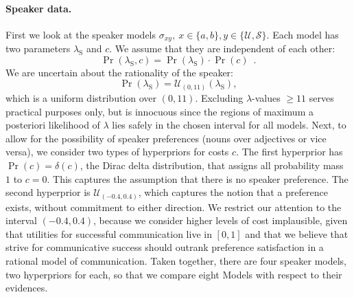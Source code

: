 \paragraph{Speaker data.} First we look at the speaker models $\sigma_{xy},\
x\in\{a,b\},y\in\{\mathcal{U},\mathcal{S}\}$. Each model has two
parameters $\lambda_\mathrm{S}$ and $c$. We assume that they are
independent of each other:
\begin{equation}\label{hyper-speaker-independent}
\Pr(\lambda_\mathrm{S},c)=\Pr(\lambda_\mathrm{S}) \cdot \Pr(c) \enspace .
\end{equation}
We are uncertain about the rationality of the speaker:
\begin{equation}\label{hyper-speaker-lambda}
\Pr(\lambda_\mathrm{S})= \mathcal{U}_{(0,11)}(\lambda_\mathrm{S}),
\end{equation}
which is a uniform distribution over $(0,11)$. Excluding
$\lambda$-values $\ge 11$ serves practical purposes only, but is
innocuous since the regions of maximum a posteriori likelihood of
$\lambda$ lies safely in the chosen interval for all models. Next, to
allow for the possibility of speaker preferences (nouns over
adjectives or vice versa), we consider two types of hyperpriors for
costs $c$. The first hyperprior has $\Pr(c)= \delta(c)$, the Dirac
delta distribution, that assigns all probability mass $1$ to
$c=0$. This captures the assumption that there is no speaker
preference. The second hyperprior is $\mathcal{U}_{(-0.4,0.4)}$, which
captures the notion that a preference exists, without commitment to
either direction. We restrict our attention to the interval
$(-0.4,0.4)$, because we consider higher levels of cost implausible,
given that utilities for successful communication live in $[0,1]$ and
that we believe that strive for communicative success should outrank
preference satisfaction in a rational model of communication. Taken
together, there are four speaker models, two hyperpriors for each, so
that we compare eight Models with respect to their evidences.

